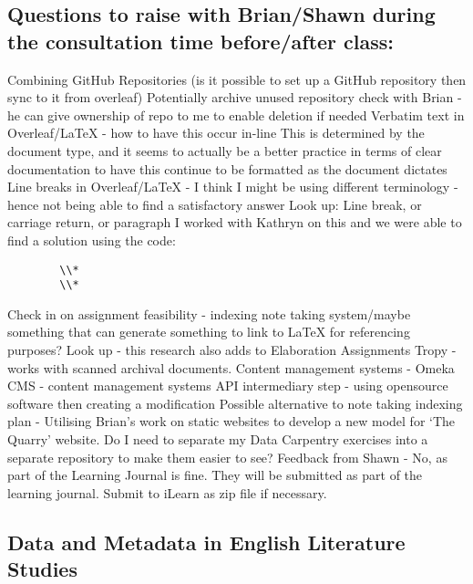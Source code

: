 \documentclass{article}
\begin{document}
\subsection{Questions to raise with Brian/Shawn during the consultation time before/after class:}
\label{ Issues raised with Brain/Shawn Week 3}
\begin{outline}[enumerate]
    \1 Combining GitHub Repositories (is it possible to set up a GitHub repository then sync to it from overleaf)
        \2 Potentially archive unused repository
        \2 check with Brian - he can give ownership of repo to me to enable deletion if needed
    \1 Verbatim text in Overleaf/LaTeX - how to have this occur in-line
        \2 This is determined by the document type, and it seems to actually be a better practice in terms of clear documentation to have this continue to be formatted as the document dictates
    \1 Line breaks in Overleaf/LaTeX - I think I might be using different terminology - hence not being able to find a satisfactory answer
        \2 Look up:
            \3 Line break, or carriage return, or paragraph
            \3 I worked with Kathryn on this and we were able to find a solution using the code:
    \begin{verbatim}
        \\*
        \\*
    \end{verbatim}
    \1 Check in on assignment feasibility - indexing note taking system/maybe something that can generate something to link to LaTeX for referencing purposes?
        \2 Look up - this research also adds to Elaboration Assignments
            \3 Tropy - works with scanned archival documents. 
            \3 Content management systems - Omeka
            \3 CMS - content management systems
            \3 API intermediary step - using opensource software then creating a modification
            \3 Possible alternative to note taking indexing plan - Utilising Brian's work on static websites to develop a new model for `The Quarry' website.
    \1 Do I need to separate my Data Carpentry exercises into a separate repository to make them easier to see?
        \2 Feedback from Shawn - No, as part of the Learning Journal is fine. They will be submitted as part of the learning journal. Submit to iLearn as zip file if necessary.
\end{outline}
    
\subsection{Data and Metadata in English Literature Studies}
\end{document}
